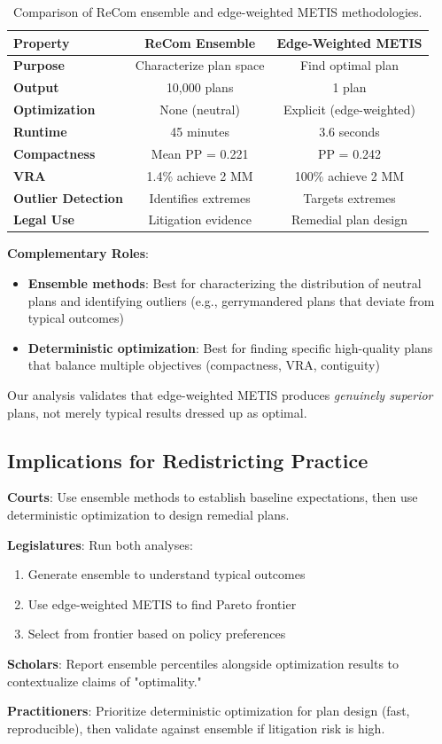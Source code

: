 \begin{table}[h]
\centering
\begin{tabular}{lcc}
\toprule
\textbf{Property} & \textbf{ReCom Ensemble} & \textbf{Edge-Weighted METIS} \\
\midrule
\textbf{Purpose} & Characterize plan space & Find optimal plan \\
\textbf{Output} & 10,000 plans & 1 plan \\
\textbf{Optimization} & None (neutral) & Explicit (edge-weighted) \\
\textbf{Runtime} & 45 minutes & 3.6 seconds \\
\textbf{Compactness} & Mean PP = 0.221 & PP = 0.242 \\
\textbf{VRA} & 1.4\% achieve 2 MM & 100\% achieve 2 MM \\
\textbf{Outlier Detection} & Identifies extremes & Targets extremes \\
\textbf{Legal Use} & Litigation evidence & Remedial plan design \\
\bottomrule
\end{tabular}
\caption{Comparison of ReCom ensemble and edge-weighted METIS methodologies.}
\end{table}

\textbf{Complementary Roles}:
\begin{itemize}
    \item \textbf{Ensemble methods}: Best for characterizing the distribution of neutral plans and identifying outliers (e.g., gerrymandered plans that deviate from typical outcomes)
    \item \textbf{Deterministic optimization}: Best for finding specific high-quality plans that balance multiple objectives (compactness, VRA, contiguity)
\end{itemize}

Our analysis validates that edge-weighted METIS produces \textit{genuinely superior} plans, not merely typical results dressed up as optimal.

\subsection{Implications for Redistricting Practice}

\textbf{Courts}: Use ensemble methods to establish baseline expectations, then use deterministic optimization to design remedial plans.

\textbf{Legislatures}: Run both analyses:
\begin{enumerate}
    \item Generate ensemble to understand typical outcomes
    \item Use edge-weighted METIS to find Pareto frontier
    \item Select from frontier based on policy preferences
\end{enumerate}

\textbf{Scholars}: Report ensemble percentiles alongside optimization results to contextualize claims of "optimality."

\textbf{Practitioners}: Prioritize deterministic optimization for plan design (fast, reproducible), then validate against ensemble if litigation risk is high.
